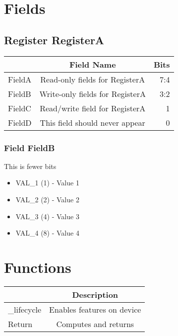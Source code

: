 \documentclass[a4paper,12pt,oneside,pdflatex,italian,final,twocolumn]{article}
\begin{document}
\raggedright

\section{Fields}



\raggedright

\subsection{Register RegisterA}
\centering
\begin{tabular}{lcr}
\toprule
  & Field Name & Bits \\
\midrule
FieldA & Read-only fields for RegisterA &
7:4
\\
FieldB & Write-only fields for RegisterA &
3:2
\\
FieldC & Read/write field for RegisterA &
1
\\
FieldD & This field should never appear &
0
\\
\bottomrule

\end{tabular}


\raggedright

\subsubsection{Field FieldB }

This is fewer bits

\begin{itemize}
\item VAL\_1 (1) - Value 1
\item VAL\_2 (2) - Value 2
\item VAL\_3 (4) - Value 3
\item VAL\_4 (8) - Value 4
\end{itemize}




\raggedright

\section{Functions}

\centering
\begin{tabular}{lc}
\toprule
  & Description \\
\midrule
_lifecycle & Enables features on device \\
Return & Computes and returns \\
\bottomrule
\end{tabular}
\end{document}
